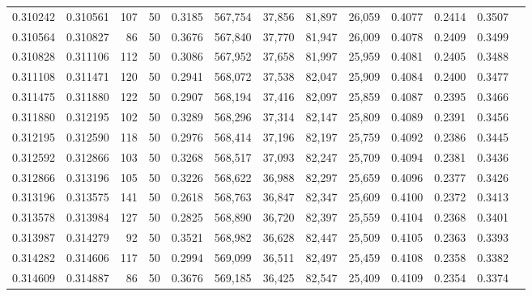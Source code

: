 \begin{tabular}{rrrrrrrrrrrrr}
0.310242 & 0.310561 &   107 &  50 &                                     0.3185 & 567,754 &  37,856 &  81,897 &  26,059 & 0.4077 & 0.2414 & 0.3507 \\
0.310564 & 0.310827 &    86 &  50 &                                     0.3676 & 567,840 &  37,770 &  81,947 &  26,009 & 0.4078 & 0.2409 & 0.3499 \\
0.310828 & 0.311106 &   112 &  50 &                                     0.3086 & 567,952 &  37,658 &  81,997 &  25,959 & 0.4081 & 0.2405 & 0.3488 \\
0.311108 & 0.311471 &   120 &  50 &                                     0.2941 & 568,072 &  37,538 &  82,047 &  25,909 & 0.4084 & 0.2400 & 0.3477 \\
0.311475 & 0.311880 &   122 &  50 &                                     0.2907 & 568,194 &  37,416 &  82,097 &  25,859 & 0.4087 & 0.2395 & 0.3466 \\
0.311880 & 0.312195 &   102 &  50 &                                     0.3289 & 568,296 &  37,314 &  82,147 &  25,809 & 0.4089 & 0.2391 & 0.3456 \\
0.312195 & 0.312590 &   118 &  50 &                                     0.2976 & 568,414 &  37,196 &  82,197 &  25,759 & 0.4092 & 0.2386 & 0.3445 \\
0.312592 & 0.312866 &   103 &  50 &                                     0.3268 & 568,517 &  37,093 &  82,247 &  25,709 & 0.4094 & 0.2381 & 0.3436 \\
0.312866 & 0.313196 &   105 &  50 &                                     0.3226 & 568,622 &  36,988 &  82,297 &  25,659 & 0.4096 & 0.2377 & 0.3426 \\
0.313196 & 0.313575 &   141 &  50 &                                     0.2618 & 568,763 &  36,847 &  82,347 &  25,609 & 0.4100 & 0.2372 & 0.3413 \\
0.313578 & 0.313984 &   127 &  50 &                                     0.2825 & 568,890 &  36,720 &  82,397 &  25,559 & 0.4104 & 0.2368 & 0.3401 \\
0.313987 & 0.314279 &    92 &  50 &                                     0.3521 & 568,982 &  36,628 &  82,447 &  25,509 & 0.4105 & 0.2363 & 0.3393 \\
0.314282 & 0.314606 &   117 &  50 &                                     0.2994 & 569,099 &  36,511 &  82,497 &  25,459 & 0.4108 & 0.2358 & 0.3382 \\
0.314609 & 0.314887 &    86 &  50 &                                     0.3676 & 569,185 &  36,425 &  82,547 &  25,409 & 0.4109 & 0.2354 & 0.3374 \\

\end{tabular}
